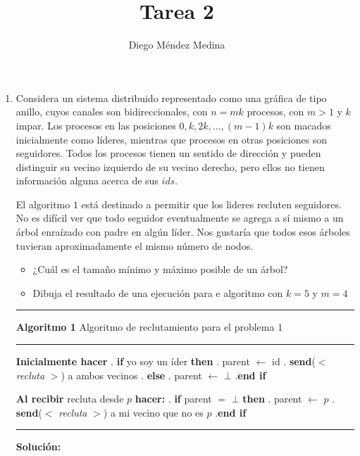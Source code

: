 \documentclass[8pt, letterpaper]{article}
\title{%
  Tarea 2\\
  {\large{}}}
\author{Diego Méndez Medina}
\date{}
\begin{document}
\ttfamily
\maketitle
\rmfamily
\begin{enumerate}
\item Considera un sistema distribuido representado como una gráfica de tipo
  anillo, cuyos canales son bidireccionales, con $n = mk$ procesos, con $m >1$
  y $k$ impar. Los procesos en las posiciones $0, k, 2k, ..., (m-1)k$ son
  macados inicialmente como líderes, mientras que procesos en otras posiciones
  son seguidores. Todos los procesos tienen un sentido de dirección y pueden
  distinguir su vecino izquierdo de su vecino derecho, pero ellos no tienen
  información alguna acerca de sus $ids$.

  El algoritmo $1$ está destinado a permitir que los lideres recluten
  seguidores. No es difícil ver que todo seguidor eventualmente se agrega a sí
  mismo a un árbol enraízado con padre en algún líder. Nos gustaría que todos
  esos árboles tuvieran aproximadamente el mismo número de nodos.
  \begin{itemize}
  \item ¿Cuál es el tamaño mínimo y máximo posible de un árbol?
  \item Dibuja el resultado de una ejecución para e algoritmo con $k = 5$ y
    $m = 4$
  \end{itemize}
  \rule{1\textwidth}{0.2mm}
  {\bf Algoritmo 1} Algoritmo de reclutamiento para el problema 1
  \hfill\break
  \rule{1\textwidth}{0.2mm}
  \hspace*{.2cm} {\bf Inicialmente hacer}
  \hfill{}. {\bf if} yo soy un íder {\bf then}
  \hfill{}. \hspace{0.5cm} parent $\leftarrow$ id
  \hfill{}. \hspace{0.5cm} {\bf send}($<$ \textit{recluta} $>$) a ambos vecinos
  \hfill{}. {\bf else}
  \hfill{}. \hspace{0.5cm} parent $\leftarrow$ $\bot$
  \hfill{}.{\bf end if}

  \hspace{0.2cm} {\bf Al recibir} recluta desde $p$ {\bf hacer:}
  \hfill{}. {\bf if} parent $=$ $\bot$ {\bf then}
  \hfill{}. \hspace{0.5cm} parent $\leftarrow$ $p$
  \hfill{}. \hspace{0.5cm} {\bf send}($<$ \textit{recluta} $>$) a mi vecino que
  no es $p$
  \hfill{}.{\bf end if}
  \hfill\break
  \rule{1\textwidth}{0.2mm}
  \hfill\break
  \ttfamily
  {\bf Solución:}


\end{enumerate}
\end{document}
